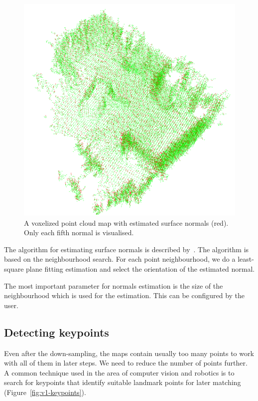 \begin{figure}
    \centering
    \includegraphics[width=\textwidth]{../img/v1-normals.png}
    \caption[A point cloud map with estimated surface normals]{A voxelized point cloud map with estimated surface normals (red). Only each fifth normal is visualised.}
    \label{fig:v1-normals}
\end{figure}

The algorithm for estimating surface normals is described by~\citet{RusuDoctoralDissertation}. The algorithm is based on the neighbourhood search. For each point neighbourhood, we do a least-square plane fitting estimation and select the orientation of the estimated normal.

The most important parameter for normals estimation is the size of the neighbourhood which is used for the estimation. This can be configured by the user.

\subsection{Detecting keypoints}
\label{sec:detect-keypoints}

Even after the down-sampling, the maps contain usually too many points to work with all of them in later steps. We need to reduce the number of points further. A common technique used in the area of computer vision and robotics is to search for keypoints that identify suitable landmark points for later matching (Figure~\ref{fig:v1-keypoints}).

